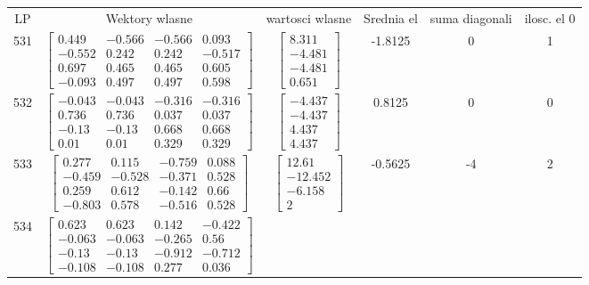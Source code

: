 \documentclass[a4paper,12pt]{article}
\begin{document}
\bgroup {} \vspace{0.2in} \begin{tabular}{c c c c c c}
LP &Wektory wlasne & wartosci wlasne & Srednia el & suma diagonali & ilosc. el 0\\
531
&
$\begin{bmatrix} 0.449 & -0.566 & -0.566 & 0.093 \\ -0.552 & 0.242 & 0.242 & -0.517 \\ 0.697 & 0.465 & 0.465 & 0.605 \\ -0.093 & 0.497 & 0.497 & 0.598 \end{bmatrix}$
&
$\begin{bmatrix} 8.311 \\ -4.481 \\ -4.481 \\ 0.651 \end{bmatrix}$
&
-1.8125
&
0
&
1
\\
532
&
$\begin{bmatrix} -0.043 & -0.043 & -0.316 & -0.316 \\ 0.736 & 0.736 & 0.037 & 0.037 \\ -0.13 & -0.13 & 0.668 & 0.668 \\ 0.01 & 0.01 & 0.329 & 0.329 \end{bmatrix}$
&
$\begin{bmatrix} -4.437 \\ -4.437 \\ 4.437 \\ 4.437 \end{bmatrix}$
&
0.8125
&
0
&
0
\\
533
&
$\begin{bmatrix} 0.277 & 0.115 & -0.759 & 0.088 \\ -0.459 & -0.528 & -0.371 & 0.528 \\ 0.259 & 0.612 & -0.142 & 0.66 \\ -0.803 & 0.578 & -0.516 & 0.528 \end{bmatrix}$
&
$\begin{bmatrix} 12.61 \\ -12.452 \\ -6.158 \\ 2 \end{bmatrix}$
&
-0.5625
&
-4
&
2
\\
534
&
$\begin{bmatrix} 0.623 & 0.623 & 0.142 & -0.422 \\ -0.063 & -0.063 & -0.265 & 0.56 \\ -0.13 & -0.13 & -0.912 & -0.712 \\ -0.108 & -0.108 & 0.277 & 0.036 \end{bmatrix}$

\end{tabular}
\end{document}
